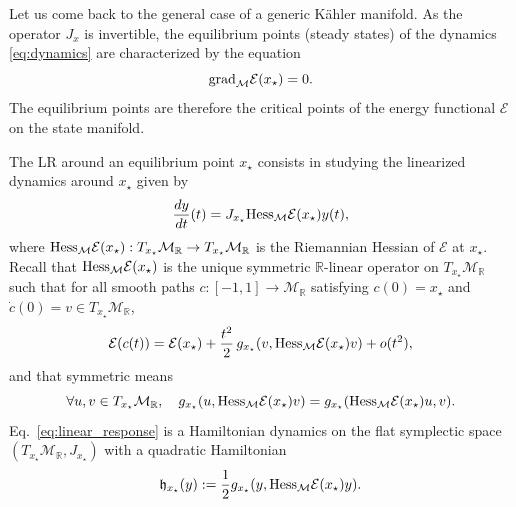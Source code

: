 \documentclass[11pt]{article}
\def\R{{\mathbb R}}
\begin{document}
\medskip

Let us come back to the general case of a generic K\"ahler manifold.
As the operator $J_x$ is invertible, the equilibrium points (steady states) of the dynamics \eqref{eq:dynamics} are characterized by the equation
\begin{equation} \label{eq:critical_points}
{{\rm grad}_{\mathcal M}\mathcal E(x_\star)=0}.
\end{equation}
The equilibrium points are therefore the critical points of the energy functional $\mathcal E$ on the state manifold.

\medskip

The LR around an equilibrium point $x_\star$ consists in studying the linearized dynamics around $x_\star$ given by
\begin{equation}\label{eq:linear_response}
{\frac{dy}{dt}(t) = J_{x_\star} {\rm Hess}_{\mathcal M} \mathcal E(x_\star) y(t)},
\end{equation}
where ${\rm Hess}_{\mathcal M}\mathcal E(x_\star) : T_{x_\star} \mathcal M_\R \to T_{x_\star}\mathcal M_\R$ is the Riemannian Hessian of $\mathcal E$ at $x_\star$. Recall that ${\rm Hess}_{\mathcal M}\mathcal E(x_\star)$ is the unique symmetric $\R$-linear operator on  $T_{x_\star} \mathcal M_\R$ such that for all smooth paths $c:[-1,1] \to \mathcal M_\R$ satisfying $c(0)=x_\star$ and $\dot c(0)=v \in T_{x_\star}\mathcal M_\R$,
$$
\mathcal E(c(t)) = \mathcal E(x_\star) + \frac{t^2}2 \,  g_{x_\star}(v,{\rm Hess}_{\mathcal M}\mathcal E(x_\star)v) + o(t^2),
$$
and that symmetric means
$$
\forall u,v \in T_{x_\star}\mathcal M_\R, \quad g_{x_\star}(u,{\rm Hess}_{\mathcal M}\mathcal E(x_\star)v)=g_{x_\star}({\rm Hess}_{\mathcal M}\mathcal E(x_\star)u,v).
$$
Eq.~\eqref{eq:linear_response} is a Hamiltonian dynamics on the flat symplectic space $(T_{x_\star} \mathcal M_\R,J_{x_\star})$ with a quadratic Hamiltonian 
$$
\mathfrak h_{x_\star}(y):= \frac 12 g_{x_\star}(y,{\rm Hess}_{\mathcal M}\mathcal E(x_\star) y).
$$


\medskip
\end{document}
